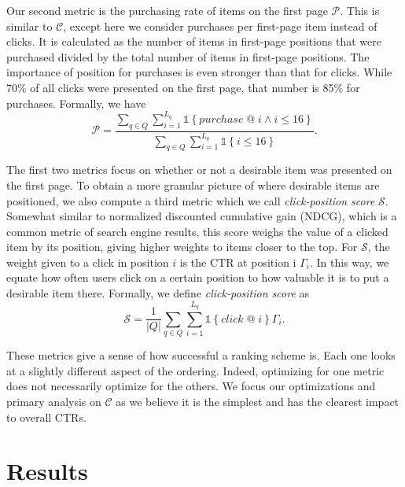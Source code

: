 \documentclass{article}
\begin{document}
Our second metric is the purchasing rate of items on the first page $\mathscr{P}$. This is 
similar to $\mathscr{C}$, except here we consider purchases per first-page item 
instead of clicks. It is calculated as the number of items in first-page positions that 
were purchased divided by the total number of items in first-page positions. The 
importance of position for purchases is even stronger than that for clicks. While 70\% of 
all clicks were presented on the first page, that number is 85\% for purchases. Formally,
we have
\begin{equation*}
    \mathscr{P} = \frac{\sum_{q \in Q}\sum_{i=1}^{L_q}\mathds{1}\left\{purchase\; @\; i \wedge i \leq 16\right\}}{\sum_{q \in Q}\sum_{i=1}^{L_q}\mathds{1}\left\{i \leq 16\right\}}.
\end{equation*}

The first two metrics focus on whether or not a desirable item was presented on the 
first page. To obtain a more granular picture of where desirable items are positioned, 
we also compute a third metric which we call {\em click-position score} $\mathscr{S}$. 
Somewhat similar to normalized discounted cumulative gain (NDCG), which is a common metric
of search engine results, this score weighs the value of a clicked item by its position, 
giving higher weights to items closer to the top. For $\mathscr{S}$, the weight given to 
a click in position $i$ is the CTR at position i $\Gamma_i$. In this way, we equate how 
often users click on a certain position to how valuable it is to put a desirable 
item there. Formally, we define {\em click-position score} as
\begin{equation*}
    \mathscr{S} = \frac{1}{\left\vert{Q}\right\vert}\sum_{q \in Q}\sum_{i=1}^{L_q}\mathds{1}\left\{click\; @\; i\right\}\Gamma_i.
\end{equation*}

These metrics give a sense of how successful a ranking scheme is. Each one looks at a slightly 
different aspect of the ordering. Indeed, optimizing for one metric does not necessarily 
optimize for the others. We focus our optimizations and primary analysis on $\mathscr{C}$
as we believe it is the simplest and has the clearest impact to overall CTRs.

\section{Results}
\end{document}
